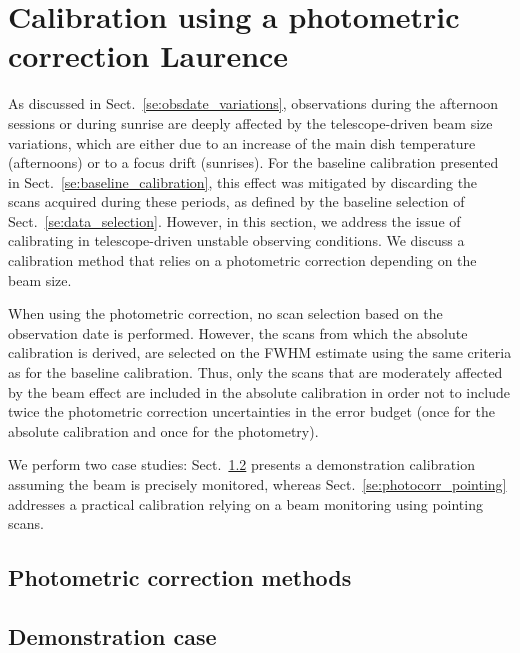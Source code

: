 \section{Calibration using a photometric correction {\color{blue} Laurence} }
\label{se:photocorr_calibration}

As discussed in Sect.~\ref{se:obsdate_variations}, observations during the
afternoon sessions or
during sunrise
are deeply affected by the telescope-driven beam
size variations, which are either due to an increase of the main dish
temperature (afternoons) or to a focus drift (sunrises).
For the baseline calibration presented in
Sect.~\ref{se:baseline_calibration}, this effect was mitigated by
discarding the scans acquired during these periods, as defined by the
baseline selection of Sect.~\ref{se:data_selection}. However, in
this section, we address the issue of calibrating in
telescope-driven unstable observing conditions. We discuss a
calibration method that relies on a photometric correction
depending on the beam size. 

When using the photometric correction, no scan selection based on the
observation date is performed. However, the scans from which the
absolute calibration is derived, are selected on the FWHM estimate
using the same criteria as for the baseline calibration. Thus, only
the scans that are moderately affected by the beam effect are included
in the absolute calibration in order not to include twice the
photometric correction uncertainties in the error budget (once for the
absolute calibration and once for the photometry).

We perform two case studies: Sect.~\ref{se:photocorr_demo} presents a demonstration
calibration assuming the beam is precisely monitored, whereas
Sect.~\ref{se:photocorr_pointing} addresses a practical calibration relying
on a beam monitoring using pointing scans. 


\subsection{Photometric correction methods}
\label{se:photocorr_methods}




\subsection{Demonstration case}
\label{se:photocorr_demo}

